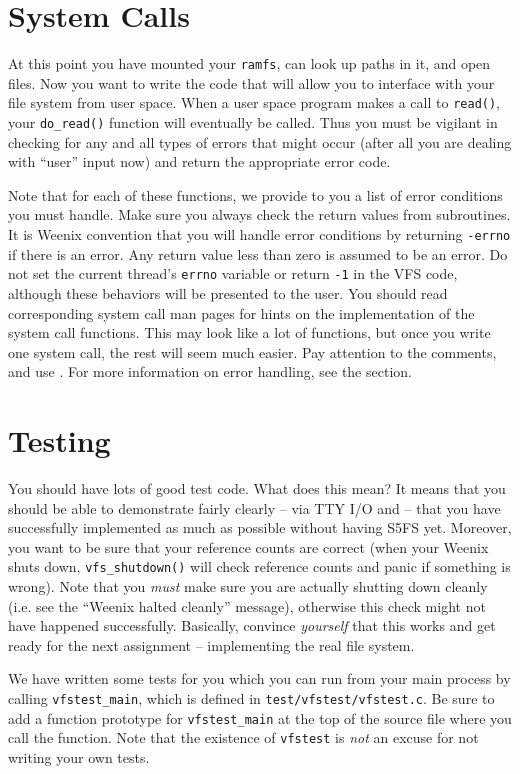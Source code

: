 \section{System Calls}

At this point you have mounted your \texttt{ramfs}, can look up paths in it, and open files. Now you want to write the code that will allow you to interface with your file system from user space. When a user space program makes a call to \texttt{read()}, your \texttt{do\_read()} function will eventually be called. Thus you must be vigilant in checking for any and all types of errors that might occur (after all you are dealing with ``user'' input now) and return the appropriate error code.

Note that for each of these functions, we provide to you a list of error
conditions you must handle.  Make sure you always check the return values from
subroutines. It is Weenix convention that you will handle error
conditions by returning \texttt{-errno} if there is an error. Any return value less than zero is
assumed to be an error. Do not set the current thread's \texttt{errno} variable or return \texttt{-1} in the VFS code, although these behaviors will be presented to the user. You should read corresponding system call man pages for
hints on the implementation of the system call functions. This may look like a lot of
functions, but once you write one system call, the rest will seem much easier.
Pay attention to the comments, and use . For
more information on error handling, see the  section.

\section{Testing}

You should have lots of good test code. What does this mean? It means that you should be able to demonstrate fairly clearly -- via TTY I/O and  -- that you have successfully implemented as much as possible without having S5FS yet. Moreover, you want to be sure that your reference counts are correct (when your Weenix shuts down, \texttt{vfs\_shutdown()} will check reference counts and panic if something is wrong). Note that you \emph{must} make sure you are actually shutting down cleanly (i.e. see the ``Weenix halted cleanly'' message), otherwise this check might not have happened successfully. Basically, convince \emph{yourself} that this works and get ready for the next assignment -- implementing the real file system.

We have written some tests for you which you can run from your main process by
calling \texttt{vfstest\_main}, which is defined in \texttt{test/vfstest/vfstest.c}. Be sure to add a function prototype for
\texttt{vfstest\_main} at the top of the source file where you call the function.
Note that the existence of \texttt{vfstest} is \emph{not} an excuse for not writing your own tests.

